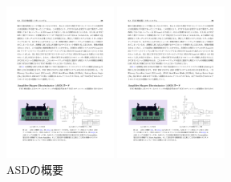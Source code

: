     \begin{figure}
    \begin{minipage}[b]{.5\linewidth}
    \centering
    \includegraphics[height=5cm]{fig/Intro/TGC_ASD.pdf}
    \end{minipage}%
    \begin{minipage}[b]{.5\linewidth}
    \centering
    \includegraphics[height=5cm]{fig/Intro/TGC_ASDcircuite.pdf}
    \end{minipage}%
    \caption[ASDの概要]{ASDの概要\cite{ASD}}
    \label{TGC_ASD}
    \end{figure}

